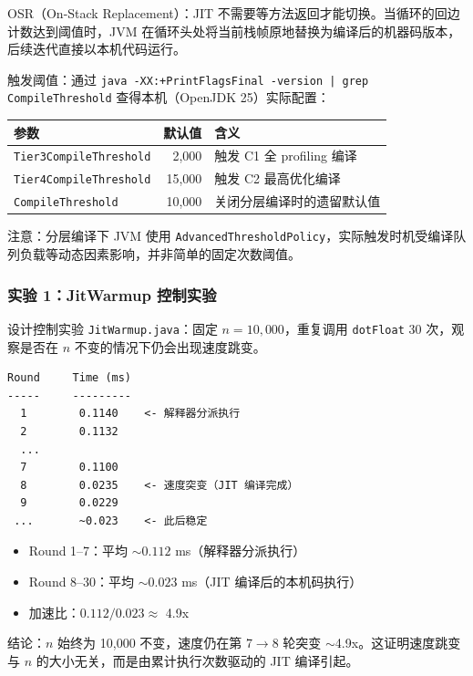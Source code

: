 \documentclass[12pt,a4paper]{article}
\begin{document}
OSR（On-Stack Replacement）：JIT 不需要等方法返回才能切换。当循环的回边计数达到阈值时，JVM 在循环头处将当前栈帧原地替换为编译后的机器码版本，后续迭代直接以本机代码运行。

触发阈值：通过 \texttt{java -XX:+PrintFlagsFinal -version | grep CompileThreshold} 查得本机（OpenJDK 25）实际配置：

\begin{table}[H]
\centering
\begin{tabular}{l r l}
\toprule
参数 & 默认值 & 含义 \\
\midrule
\texttt{Tier3CompileThreshold} & 2{,}000 & 触发 C1 全 profiling 编译 \\
\texttt{Tier4CompileThreshold} & 15{,}000 & 触发 C2 最高优化编译 \\
\texttt{CompileThreshold} & 10{,}000 & 关闭分层编译时的遗留默认值 \\
\bottomrule
\end{tabular}
\end{table}

注意：分层编译下 JVM 使用 \texttt{AdvancedThresholdPolicy}，实际触发时机受编译队列负载等动态因素影响，并非简单的固定次数阈值。

\subsubsection{实验 1：JitWarmup 控制实验}

设计控制实验 \texttt{JitWarmup.java}：固定 $n=10{,}000$，重复调用 \texttt{dotFloat} 30 次，观察是否在 $n$ 不变的情况下仍会出现速度跳变。

\begin{lstlisting}
Round     Time (ms)
-----     ---------
  1        0.1140    <- 解释器分派执行
  2        0.1132
  ...
  7        0.1100
  8        0.0235    <- 速度突变（JIT 编译完成）
  9        0.0229
 ...       ~0.023    <- 此后稳定
\end{lstlisting}

\begin{itemize}
  \item Round 1--7：平均 ${\sim}0.112$ ms（解释器分派执行）
  \item Round 8--30：平均 ${\sim}0.023$ ms（JIT 编译后的本机码执行）
  \item 加速比：$0.112 / 0.023 \approx$ 4.9x
\end{itemize}

结论：$n$ 始终为 10{,}000 不变，速度仍在第 7$\to$8 轮突变 ${\sim}$4.9x。这证明速度跳变与 $n$ 的大小无关，而是由累计执行次数驱动的 JIT 编译引起。
\end{document}
